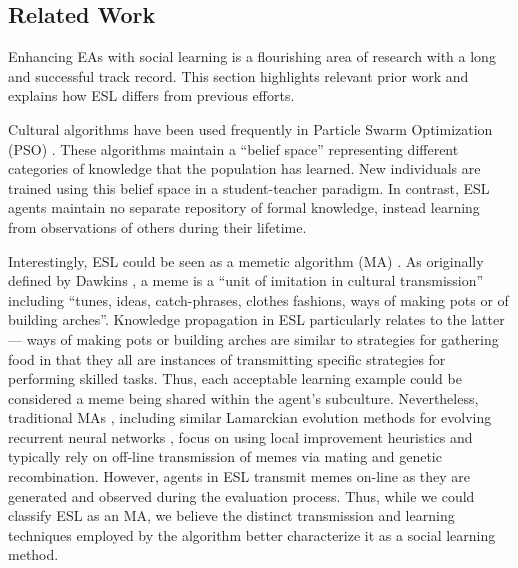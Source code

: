 \documentclass{sig-alternate}
\begin{document}
\subsection{Related Work}

Enhancing EAs with social learning is a flourishing area of research with a long and successful track record. This section highlights relevant prior work and explains how ESL differs from previous efforts.

Cultural algorithms \cite{reynolds1994introduction} have been used frequently in Particle Swarm Optimization (PSO) \cite{kennedy1995particle}. These algorithms maintain a ``belief space'' representing different categories of knowledge that the population has learned. New individuals are trained using this belief space in a student-teacher paradigm. In contrast, ESL agents maintain no separate repository of formal knowledge, instead learning from observations of others during their lifetime.

Interestingly, ESL could be seen as a memetic algorithm (MA) \cite{moscato1989evolution}. As originally defined by Dawkins \cite{dawkins2006selfish}, a meme is a ``unit of imitation in cultural transmission'' including ``tunes, ideas, catch-phrases, clothes fashions, ways of making pots or of building arches''. Knowledge propagation in ESL particularly relates to the latter--- ways of making pots or building arches are similar to strategies for gathering food in that they all are instances of transmitting specific strategies for performing skilled tasks. Thus, each acceptable learning example could be considered a meme being shared within the agent's subculture. Nevertheless, traditional MAs \cite{onwubolu2004new}, including similar Lamarckian evolution methods for evolving recurrent neural networks \cite{ku2000study}, focus on using local improvement heuristics and typically rely on off-line transmission of memes via mating and genetic recombination. However, agents in ESL transmit memes on-line as they are generated and observed during the evaluation process. Thus, while we could classify ESL as an MA, we believe the distinct transmission and learning techniques employed by the algorithm better characterize it as a social learning method.
\end{document}
